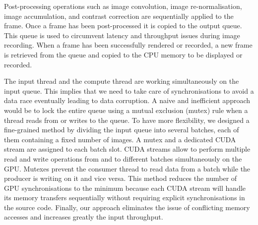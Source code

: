 Post-processing operations such as image convolution, image re-normalisation, image accumulation, and contrast correction are sequentially applied to the frame. Once a frame has been post-processed it is copied to the output queue. This queue is used to circumvent latency and throughput issues during image recording. When a frame has been successfully rendered or recorded, a new frame is retrieved from the queue and copied to the CPU memory to be displayed or recorded.


The input thread and the compute thread are working simultaneously on the input queue. This implies that we need to take care of synchronisations to avoid a data race eventually leading to data corruption. A naive and inefficient approach would be to lock the entire queue using a mutual exclusion (mutex) rule when a thread reads from or writes to the queue. To have more flexibility, we designed a fine-grained method by dividing the input queue into several batches, each of them containing a fixed number of images. A mutex and a dedicated CUDA stream are assigned to each batch slot. CUDA streams allow to perform multiple read and write operations from and to different batches simultaneously on the GPU. Mutexes prevent the consumer thread to read data from a batch while the producer is writing on it and vice versa. This method reduces the number of GPU synchronisations to the minimum because each CUDA stream will handle its memory transfers sequentially without requiring explicit synchronisations in the source code. Finally, our approach eliminates the issue of conflicting memory accesses and increases greatly the input throughput.